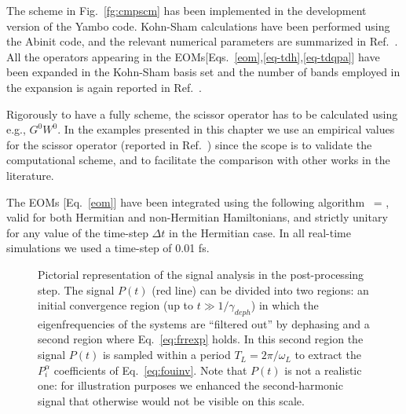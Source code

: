 The scheme in Fig.~\ref{fg:cmpscm} has been implemented in the development version of the {\sc Yambo} code.\cite{yambo} 
Kohn-Sham calculations have been performed using the {\sc Abinit} code,\cite{abinit} and the relevant numerical parameters are summarized in Ref.~\cite{nloptics2013}. All the operators  appearing in the EOMs[Eqs.~\eqref{eom},\eqref{eq-tdh},\eqref{eq-tdqpa}] have been expanded in the Kohn-Sham basis set and the number of bands employed in the expansion is again reported in Ref.~\cite{nloptics2013}. 

Rigorously to have a fully \ai scheme, the scissor operator has to be calculated using e.g., $G^0W^0$. In the examples presented in this chapter we use an empirical values for the scissor operator (reported in Ref.~\cite{nloptics2013}) since the scope is to validate the computational scheme, and to facilitate the comparison with other works in the literature.



The EOMs [Eq.~\eqref{eom}] have been integrated using the following algorithm~\cite{koonin90}
\be
\label{eq:time_evolution}
=  ,
\ee
valid for both Hermitian and non-Hermitian Hamiltonians, and strictly unitary for any value of the time-step $\Delta t$ in the Hermitian case. In all real-time simulations we used a time-step of 0.01 fs.\\

\begin{figure}[ht]
\centering
{}
\caption{\footnotesize{Pictorial representation of the signal analysis in the post-processing step. The signal  $P(t)$ (red line) can be divided into two regions: an initial convergence region (up to $t\gg 1/\gamma_{deph}$) in which the eigenfrequencies of the systems are ``filtered out'' by dephasing and a second region where Eq.~\eqref{eq:frrexp} holds. In this second region the signal $P(t)$ is sampled within a period $T_L=2\pi/\omega_L$ to extract the $P^\alpha_i$ coefficients of Eq.~\ref{eq:fouinv}. Note that $P(t)$ is not a realistic one: for illustration purposes we enhanced the second-harmonic signal that otherwise would not be visible on this scale.}} 
\label{fg:ptanalysis}
\end{figure} 

